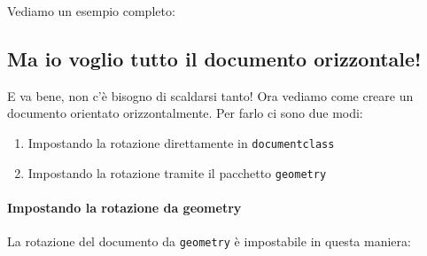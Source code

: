 \vspace{\abovedisplayskip}
\begin{minipage}{\linewidth}
  \noindent Vediamo un esempio completo:
  
\end{minipage}
\vspace{\belowdisplayskip}

\subsection{Ma io voglio tutto il documento orizzontale!}

E va bene, non c'è bisogno di scaldarsi tanto! Ora vediamo come creare un 
documento orientato orizzontalmente. Per farlo ci sono due modi:
\begin{enumerate}
 \item Impostando la rotazione direttamente in \texttt{documentclass}
 \item Impostando la rotazione tramite il pacchetto \texttt{geometry}
\end{enumerate}


\vspace{\abovedisplayskip}
\begin{minipage}{\linewidth}
  \paragraph*{Impostando la rotazione da geometry}
  
  La rotazione del documento da \texttt{geometry} è impostabile in questa 
  maniera:
  


\end{minipage}
\vspace{\belowdisplayskip}